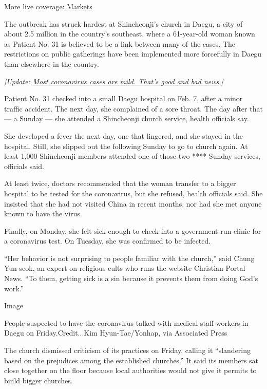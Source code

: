 More live coverage:
\href{https://www.nytimes.com/live/2020/07/31/business/stock-market-today-coronavirus?action=click\&pgtype=Article\&state=default\&region=MAIN_CONTENT_1\&context=storylines_live_updates}{Markets}

The outbreak has struck hardest at Shincheonji's church in Daegu, a city
of about 2.5 million in the country's southeast, where a 61-year-old
woman known as Patient No. 31 is believed to be a link between many of
the cases. The restrictions on public gatherings have been implemented
more forcefully in Daegu than elsewhere in the country.

\emph{{[}Update:}
\href{http://www.nytimes.com/2020/02/27/world/asia/coronavirus-treament-recovery.html}{\emph{Most
coronavirus cases are mild. That's good and bad news}}\emph{.{]}}

Patient No. 31 checked into a small Daegu hospital on Feb. 7, after a
minor traffic accident. The next day, she complained of a sore throat.
The day after that --- a Sunday --- she attended a Shincheonji church
service, health officials say.

She developed a fever the next day, one that lingered, and she stayed in
the hospital. Still, she slipped out the following Sunday to go to
church again. At least 1,000 Shincheonji members attended one of those
two **** Sunday services, officials said.

At least twice, doctors recommended that the woman transfer to a bigger
hospital to be tested for the coronavirus, but she refused, health
officials said. She insisted that she had not visited China in recent
months, nor had she met anyone known to have the virus.

Finally, on Monday, she felt sick enough to check into a government-run
clinic for a coronavirus test. On Tuesday, she was confirmed to be
infected.

``Her behavior is not surprising to people familiar with the church,''
said Chung Yun-seok, an expert on religious cults who runs the website
Christian Portal News. ``To them, getting sick is a sin because it
prevents them from doing God's work.''

Image

People suspected to have the coronavirus talked with medical staff
workers in Daegu on Friday.Credit...Kim Hyun-Tae/Yonhap, via Associated
Press

The church dismissed criticism of its practices on Friday, calling it
``slandering based on the prejudices among the established churches.''
It said its members sat close together on the floor because local
authorities would not give it permits to build bigger churches.


